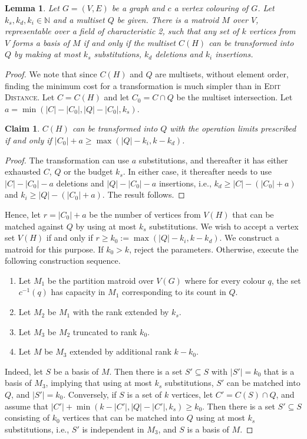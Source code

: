 \documentclass[10pt,a4paper]{article}
\newenvironment{subproof}{\begin{proof}[Proof]}{\end{proof}}
\newtheorem{lemma}{Lemma}[section]
\newtheorem{claim}{Claim}[section]
\newcommand{\N}{\ensuremath{\mathbb N}\xspace}
\begin{document}
\begin{lemma}
  Let $G=(V,E)$ be a graph and $c$ a vertex colouring of $G$.
  Let $k_s, k_d, k_i \in \N$ and a multiset $Q$ be given.
  There is a matroid $M$ over $V$, representable over a field of characteristic 2,
  such that any set of $k$ vertices from $V$ forms a basis of $M$
  if and only if the multiset $C(H)$ can be transformed into $Q$
  by making at most $k_s$ substitutions, $k_d$ deletions and $k_i$
  insertions. 
\end{lemma}
\begin{proof}
  We note that since $C(H)$ and $Q$ are multisets, without element
  order, finding the minimum cost for a transformation is much simpler
  than in \textsc{Edit Distance}. Let $C=C(H)$ and let $C_0=C \cap Q$
  be the multiset intersection. Let $a=\min(|C|-|C_0|,|Q|-|C_0|,k_s)$.
  
  \begin{claim}
    $C(H)$ can be transformed into $Q$ with the operation limits
    prescribed if and only if $|C_0|+a \geq \max(|Q|-k_i,k-k_d)$.
  \end{claim}
  \begin{subproof}
    The transformation can use $a$ substitutions, and thereafter it
    has either exhausted $C$, $Q$ or the budget $k_s$. In either case, 
    it thereafter needs to use $|C|-|C_0|-a$ deletions and
    $|Q|-|C_0|-a$ insertions, i.e.,
    $k_d \geq |C|-(|C_0|+a)$ and $k_i \geq |Q|-(|C_0|+a)$. 
    The result follows.
  \end{subproof}

  Hence, let $r=|C_0|+a$ be the number of vertices from $V(H)$ that
  can be matched against $Q$ by using at most $k_s$ substitutions.
  We wish to accept a vertex set $V(H)$ if and only if
  $r \geq k_0 := \max(|Q|-k_i,k-k_d)$. We construct a matroid for this purpose.
  If $k_0>k$, reject the parameters. Otherwise, execute the following
  construction sequence.
  \begin{enumerate}
  \item Let $M_1$ be the partition matroid over $V(G)$ where for every
    colour $q$, the set $c^{-1}(q)$ has capacity in $M_1$ corresponding
    to its count in $Q$. 
  \item Let $M_2$ be $M_1$ with the rank extended by $k_s$.
  \item Let $M_3$ be $M_2$ truncated to rank $k_0$.
  \item Let $M$ be $M_3$ extended by additional rank $k-k_0$.    
  \end{enumerate}
  Indeed, let $S$ be a basis of $M$. Then there is a set $S' \subseteq S$
  with $|S'|=k_0$ that is a basis of $M_3$, implying that using at
  most $k_s$ substitutions, $S'$ can be matched into $Q$, and $|S'|=k_0$.
  Conversely, if $S$ is a set of $k$ vertices, let $C'=C(S) \cap Q$,
  and assume that $|C'|+\min(k-|C'|, |Q|-|C'|,k_s) \geq k_0$.
  Then there is a set $S' \subseteq S$ consisting of $k_0$
  vertices that can be matched into $Q$ using at most $k_s$
  substitutions, i.e., $S'$ is independent in $M_3$,
  and $S$ is a basis of $M$. 
\end{proof}
\end{document}
